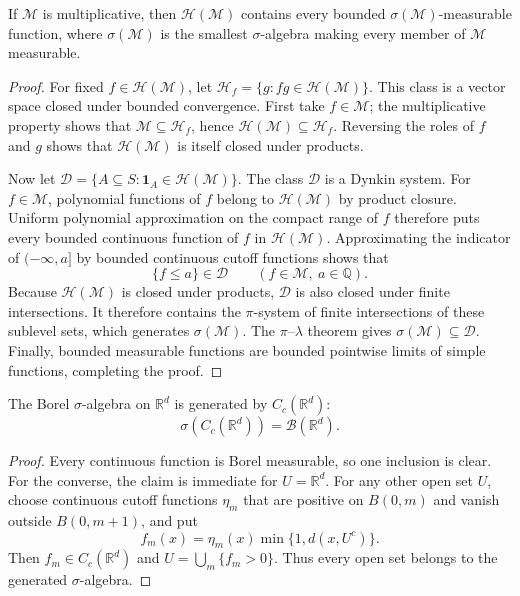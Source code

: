 \begin{thm}
If $\mathcal M$ is multiplicative, then $\mathcal H(\mathcal M)$ contains
every bounded $\sigma(\mathcal M)$-measurable function, where
$\sigma(\mathcal M)$ is the smallest $\sigma$-algebra making every member of
$\mathcal M$ measurable.
\end{thm}

\begin{proof}
For fixed $f\in\mathcal H(\mathcal M)$, let
$\mathcal H_f=\{g:fg\in\mathcal H(\mathcal M)\}$. This class is a vector
space closed under bounded convergence. First take $f\in\mathcal M$; the
multiplicative property shows that $\mathcal M\subseteq\mathcal H_f$, hence
$\mathcal H(\mathcal M)\subseteq\mathcal H_f$. Reversing the roles of $f$
and $g$ shows that $\mathcal H(\mathcal M)$ is itself closed under products.

Now let
$\mathcal D=\{A\subseteq S:\mathbf1_A\in\mathcal H(\mathcal M)\}$. The class
$\mathcal D$ is a Dynkin system. For $f\in\mathcal M$, polynomial functions of
$f$ belong to $\mathcal H(\mathcal M)$ by product closure. Uniform polynomial
approximation on the compact range of $f$ therefore puts every bounded
continuous function of $f$ in $\mathcal H(\mathcal M)$. Approximating the
indicator of $(-\infty,a]$ by bounded continuous cutoff functions shows that
\[
\{f\leq a\}\in\mathcal D
\qquad(f\in\mathcal M,\ a\in\mathbb Q).
\]
Because $\mathcal H(\mathcal M)$ is closed under products, $\mathcal D$ is
also closed under finite intersections. It therefore contains the
$\pi$-system of finite intersections of these sublevel sets, which generates
$\sigma(\mathcal M)$. The $\pi$--$\lambda$ theorem gives
$\sigma(\mathcal M)\subseteq\mathcal D$. Finally, bounded measurable
functions are bounded pointwise limits of simple functions, completing the
proof.
\end{proof}

\begin{prop}
The Borel $\sigma$-algebra on $\mathbb R^d$ is generated by
$C_c(\mathbb R^d)$:
\[
\sigma(C_c(\mathbb R^d))=\mathcal B(\mathbb R^d).
\]
\end{prop}

\begin{proof}
Every continuous function is Borel measurable, so one inclusion is clear.
For the converse, the claim is immediate for $U=\mathbb R^d$. For any other
open set $U$, choose continuous cutoff functions $\eta_m$ that are positive on
$B(0,m)$ and vanish outside $B(0,m+1)$, and put
\[
f_m(x)=\eta_m(x)\min\{1,d(x,U^c)\}.
\]
Then $f_m\in C_c(\mathbb R^d)$ and
$U=\bigcup_m\{f_m>0\}$. Thus every open set belongs to the generated
$\sigma$-algebra.
\end{proof}

